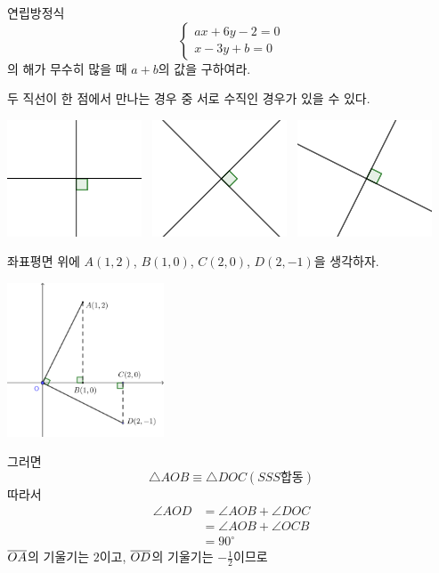 \documentclass{oblivoir}
\begin{document}
\prob{}\label{two7}
연립방정식
\[
\begin{cases}
ax+6y-2=0\\
x-3y+b=0
\end{cases}
\]
의 해가 무수히 많을 때 \(a+b\)의 값을 구하여라.

\clearpage
두 직선이 한 점에서 만나는 경우 중 서로 수직인 경우가 있을 수 있다.
\begin{center}
\includegraphics[width=0.3\textwidth]{perp_01}
~\includegraphics[width=0.3\textwidth]{perp_02}
~\includegraphics[width=0.3\textwidth]{perp_03}
\end{center}

\exam{}\label{two8}
좌표평면 위에 \(A(1,2)\), \(B(1,0)\), \(C(2,0)\), \(D(2,-1)\)을 생각하자.
\begin{center}
\includegraphics[width=0.35\textwidth]{twolines_7}
\end{center}
그러면
\[\triangle AOB\equiv\triangle DOC(SSS합동)\]
따라서
\begin{align*}
\angle AOD
&=\angle AOB+\angle DOC\\
&=\angle AOB+\angle OCB\\
&=90^\circ
\end{align*}
\(\overline{OA}\)의 기울기는 \(2\)이고, \(\overline{OD}\)의 기울기는 \(-\frac12\)이므로
\begin{center}
\end{center}
\end{document}
